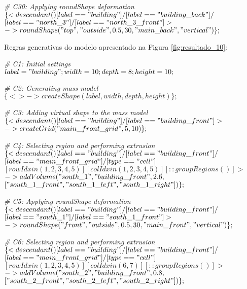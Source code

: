\noindent \textit{\# C30: Applying roundShape deformation}\\
$\{< descendant() [label=="building"] / [label=="building\_back"] / $\\
$[label=="north\_3"] / [label=="north\_3\_front"] > $\\
$-> roundShape("top", "outside", 0.5, 30, "main\_back", "vertical")\};$

\vspace{1cm}

Regras generativas do modelo apresentado na Figura \ref{fig:resultado_10}:

\noindent \textit{\# C1: Initial settings}\\
$label = "building"; width = 10; depth = 8; height = 10;$

\noindent \textit{\# C2: Generating mass model}\\
$\{<> -> createShape(label, width, depth, height)\};$

\noindent \textit{\# C3: Adding virtual shape to the mass model}\\
$\{< descendant() [label=="building"] / [label=="building\_front"] > $\\
$-> createGrid("main\_front\_grid", 5, 10)\};$

\noindent \textit{\# C4: Selecting region and performing extrusion}\\
$\{< descendant() [label=="building"] / [label=="building\_front"] / $\\
$[label=="main\_front\_grid"] / [type=="cell"] $\\
$[rowIdx in (1, 2, 3, 4, 5)] [colIdx in (1, 2, 3, 4, 5)] [::groupRegions()] > $\\
$-> addVolume("south\_1", "building\_front", 2.6, $\\
$["south\_1\_front", "south\_1\_left", "south\_1\_right"])\};$

\noindent \textit{\# C5: Applying roundShape deformation}\\
$\{< descendant() [label=="building"] / [label=="building\_front"] / $\\
$[label=="south\_1"] / [label=="south\_1\_front"] > $\\
$-> roundShape("front", "outside", 0.5, 30, "main\_front", "vertical")\};$

\noindent \textit{\# C6: Selecting region and performing extrusion}\\
$\{< descendant() [label=="building"] / [label=="building\_front"] / $\\
$[label=="main\_front\_grid"] / [type=="cell"] $\\
$[rowIdx in (1, 2, 3, 4, 5)] [colIdx in (6, 7)] [::groupRegions()] > $\\
$-> addVolume("south\_2", "building\_front", 0.8, $\\
$["south\_2\_front", "south\_2\_left", "south\_2\_right"])\};$


